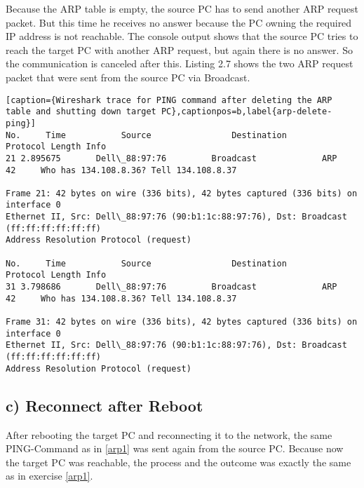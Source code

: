 Because the ARP table is empty, the source PC has to send another ARP request packet. But this time he receives no answer because the PC owning the required IP address is not reachable. The console output shows that the source PC tries to reach the target PC with another ARP request, but again there is no answer. So the communication is canceled after this. Listing 2.7 shows the two ARP request packet that were sent from the source PC via Broadcast.\\
 \begin{lstlisting}[caption={Wireshark trace for PING command after deleting the ARP table and shutting down target PC},captionpos=b,label{arp-delete-ping}]
No.     Time           Source                Destination           Protocol Length Info
21 2.895675       Dell\_88:97:76         Broadcast             ARP      42     Who has 134.108.8.36? Tell 134.108.8.37

Frame 21: 42 bytes on wire (336 bits), 42 bytes captured (336 bits) on interface 0
Ethernet II, Src: Dell\_88:97:76 (90:b1:1c:88:97:76), Dst: Broadcast (ff:ff:ff:ff:ff:ff)
Address Resolution Protocol (request)

No.     Time           Source                Destination           Protocol Length Info
31 3.798686       Dell\_88:97:76         Broadcast             ARP      42     Who has 134.108.8.36? Tell 134.108.8.37

Frame 31: 42 bytes on wire (336 bits), 42 bytes captured (336 bits) on interface 0
Ethernet II, Src: Dell\_88:97:76 (90:b1:1c:88:97:76), Dst: Broadcast (ff:ff:ff:ff:ff:ff)
Address Resolution Protocol (request)
 \end{lstlisting}
 
\subsection{c) Reconnect after Reboot}
After rebooting the target PC and reconnecting it to the network, the same PING-Command as in \ref{arp1} was sent again from the source PC. Because now the target PC was reachable, the process and the outcome was exactly the same as in exercise \ref{arp1}.
